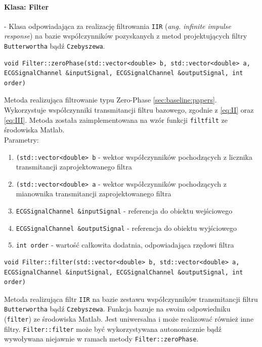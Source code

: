 \documentclass[a4paper, 11pt]{article}
\begin{document}
\paragraph{Klasa: Filter}
- Klasa odpowiadająca za realizację filtrowania \verb|IIR| (\textit{ang. infinite impulse response}) na bazie współczynników pozyskanych z metod projektujących filtry \verb|Butterwortha| bądź \verb|Czebyszewa|. 

\begin{lstlisting}
void Filter::zeroPhase(std::vector<double> b, std::vector<double> a,
ECGSignalChannel &inputSignal, ECGSignalChannel &outputSignal, int order)
\end{lstlisting}
Metoda realizująca filtrowanie typu Zero-Phase \ref{sec:baseline:papers}. Wykorzystuje współczynniki transmitancji filtru bazowego, zgodnie z \eqref{eq:II} oraz \eqref{eq:III}. Metoda została zaimplementowana na wzór funkcji \verb|filtfilt| ze środowiska Matlab.\\

Parametry:
\begin{enumerate}
\item \verb|(std::vector<double> b| - wektor współczynników pochodzących z licznika transmitancji zaprojektowanego filtra
\item \verb|(std::vector<double> a| - wektor współczynników pochodzących z mianownika transmitancji zaprojektowanego filtra
\item \verb|ECGSignalChannel &inputSignal| - referencja do obiektu wejściowego
\item \verb|ECGSignalChannel &outputSignal| - referencja do obiektu wyjściowego
\item \verb|int order| - wartość całkowita dodatnia, odpowiadająca rzędowi filtra
\end{enumerate}

\begin{lstlisting}
void Filter::filter(std::vector<double> b, std::vector<double> a,
ECGSignalChannel &inputSignal, ECGSignalChannel &outputSignal, int order)
\end{lstlisting}

Metoda realizująca filtr \verb|IIR| na bazie zestawu współczynników transmitancji filtru \verb|Butterwortha| bądź \verb|Czebyszewa|. Funkcja bazuje na swoim odpowiedniku (\verb|filter|) ze środowiska Matlab. Jest uniwersalna i może realizować również inne filtry. \verb|Filter::filter| może być wykorzystywana autonomicznie bądź wywoływana niejawnie w ramach metody \verb|Filter::zeroPhase|.\\
\end{document}
